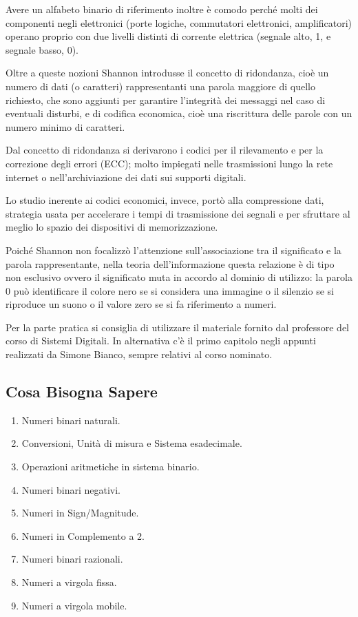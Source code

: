\documentclass[12pt]{article}
\begin{document}
 Avere un alfabeto binario di riferimento inoltre è comodo perché molti dei componenti negli elettronici (porte logiche, commutatori elettronici, amplificatori) operano proprio con due livelli distinti di corrente elettrica (segnale alto, 1, e segnale basso, 0).\par\medskip\noindent
Oltre a queste nozioni Shannon introdusse il concetto di ridondanza, cioè un numero di dati (o caratteri) rappresentanti una parola maggiore di quello richiesto, che sono aggiunti per garantire l’integrità dei messaggi nel caso di eventuali disturbi, e di codifica economica, cioè una riscrittura delle parole con un numero minimo di caratteri. \par\medskip\noindent
Dal concetto di ridondanza si derivarono i codici per il rilevamento e per la correzione degli errori (ECC); molto impiegati nelle trasmissioni lungo la rete internet o nell’archiviazione dei dati sui supporti digitali. \par\medskip\noindent
Lo studio inerente ai codici economici, invece, portò alla compressione dati, strategia usata per accelerare i tempi di trasmissione dei segnali e per sfruttare al meglio lo spazio dei dispositivi di memorizzazione.\par\medskip\noindent
Poiché Shannon non focalizzò l’attenzione sull’associazione tra il significato e la parola rappresentante, nella teoria dell’informazione questa relazione è di tipo non esclusivo ovvero il significato muta in accordo al dominio di utilizzo: la parola 0 può identificare il colore nero se si considera una immagine o il silenzio se si riproduce un suono o il valore zero se si fa riferimento a numeri.\par\medskip\noindent
Per la parte pratica si consiglia di utilizzare il materiale fornito dal professore del corso di Sistemi Digitali. In alternativa c’è il primo capitolo negli appunti realizzati da Simone Bianco, sempre relativi al corso nominato. 
\subsection{Cosa Bisogna Sapere}
\begin{enumerate}
    \item Numeri binari naturali.
    \item Conversioni, Unità di misura e Sistema esadecimale. 
    \item Operazioni aritmetiche in sistema binario. 
    \item Numeri binari negativi. 
    \item Numeri in Sign/Magnitude. 
    \item Numeri in Complemento a 2. 
    \item Numeri binari razionali. 
    \item Numeri a virgola fissa. 
    \item Numeri a virgola mobile. 
\end{enumerate}
\end{document}
